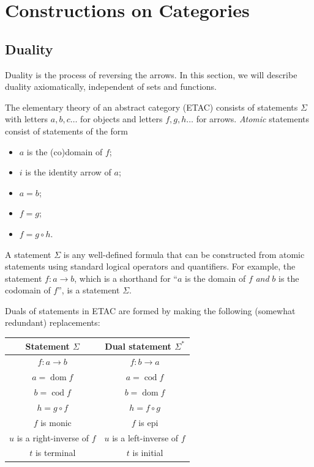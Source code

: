 \chapter{Constructions on Categories}

\section{Duality}

Duality is the process of reversing the arrows. In this section, we will describe duality axiomatically, independent of sets and functions.

The elementary theory of an abstract category (ETAC) consists of statements $\Sigma $ with letters $a,b,c\ldots $ for objects and letters $f,g,h\ldots $ for arrows. \emph{Atomic} statements consist of statements of the form
\begin{itemize}
	\item $a$ is the (co)domain of $f$;
	\item $i$ is the identity arrow of $a$;
	\item $a=b$;
	\item $f=g$;
	\item $f=g\circ h$.
\end{itemize}
A statement $\Sigma $ is any well-defined formula that can be constructed from atomic statements using standard logical operators and quantifiers. For example, the statement $f : a \to b$, which is a shorthand for ``$a$ is the domain of $f$ \emph{and} $b$ is the codomain of $f$'', is a statement $\Sigma $.

Duals of statements in ETAC are formed by making the following (somewhat redundant) replacements:
\begin{center}\begin{tabular}{c|c}
	Statement $\Sigma $&Dual statement $\Sigma^*$\\
	\hline
	$f : a \to b$&$f : b \to a$\\
	$a=\operatorname{dom} f$&$a=\operatorname{cod} f$\\
	$b=\operatorname{cod} f$&$b=\operatorname{dom} f$\\
	$h=g\circ f$&$h=f\circ g$\\
	$f$ is monic&$f$ is epi\\
	$u$ is a right-inverse of $f$&$u$ is a left-inverse of $f$\\
	$t$ is terminal&$t$ is initial
\end{tabular}\end{center}

